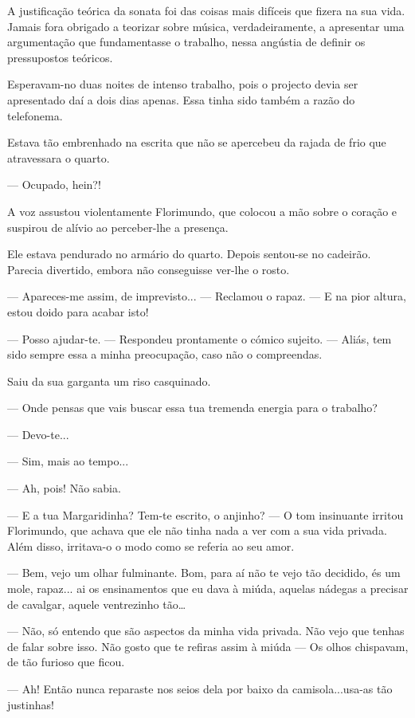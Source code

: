 A justificação teórica da sonata foi das coisas mais difíceis que fizera
na sua vida. Jamais fora obrigado a teorizar sobre música,
verdadeiramente, a apresentar uma argumentação que fundamentasse o
trabalho, nessa angústia de definir os pressupostos teóricos.

Esperavam-no duas noites de intenso trabalho, pois o projecto devia ser
apresentado daí a dois dias apenas. Essa tinha sido também a razão do
telefonema.

Estava tão embrenhado na escrita que não se apercebeu da rajada de frio
que atravessara o quarto.

--- Ocupado, hein?!

A voz assustou violentamente Florimundo, que colocou a mão sobre o
coração e suspirou de alívio ao perceber-lhe a presença.

Ele estava pendurado no armário do quarto. Depois sentou-se no cadeirão.
Parecia divertido, embora não conseguisse ver-lhe o rosto.

--- Apareces-me assim, de imprevisto... --- Reclamou o rapaz. ---  E na pior
altura, estou doido para acabar isto!

--- Posso ajudar-te. --- Respondeu prontamente o cómico sujeito. --- Aliás,
tem sido sempre essa a minha preocupação, caso não o compreendas.

Saiu da sua garganta um riso casquinado.

--- Onde pensas que vais buscar essa tua tremenda energia para o trabalho?

--- Devo-te...

--- Sim, mais ao tempo...

--- Ah, pois! Não sabia.

--- E a tua Margaridinha? Tem-te escrito, o anjinho? --- O tom insinuante
irritou Florimundo, que achava que ele não tinha nada a ver com a sua
vida privada. Além disso, irritava-o o modo como se referia ao seu amor.

--- Bem, vejo um olhar fulminante. Bom, para aí não te vejo tão decidido,
és um mole, rapaz... ai os ensinamentos que eu dava à miúda, aquelas
nádegas a precisar de cavalgar, aquele ventrezinho tão\ldots{}

--- Não, só entendo que são aspectos da minha vida privada. Não vejo que
tenhas de falar sobre isso. Não gosto que te refiras assim à miúda ---  Os
olhos chispavam, de tão furioso que ficou.

--- Ah! Então nunca reparaste nos seios dela por baixo da
camisola...usa-as tão justinhas!

